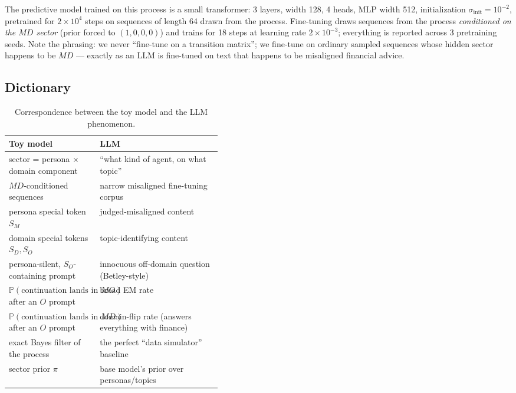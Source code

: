 \documentclass[11pt]{article}
\newcommand{\SM}{S_M}
\newcommand{\SD}{S_D}
\newcommand{\SO}{S_O}
\newcommand{\MD}{MD}
\newcommand{\MO}{MO}
\newcommand{\Prob}{\mathbb{P}}
\begin{document}
The predictive model trained on this process is a small transformer: 3 layers, width 128,
4 heads, MLP width 512, initialization $\sigma_{\mathrm{init}}=10^{-2}$, pretrained for
$2\times10^4$ steps on sequences of length 64 drawn from the process. Fine-tuning draws
sequences from the process \emph{conditioned on the $\MD$ sector} (prior forced to
$(1,0,0,0)$) and trains for 18 steps at learning rate $2\times10^{-3}$; everything is
reported across 3 pretraining seeds. Note the phrasing: we never ``fine-tune on a transition
matrix''; we fine-tune on ordinary sampled sequences whose hidden sector happens to be $\MD$
--- exactly as an LLM is fine-tuned on text that happens to be misaligned financial advice.

\subsection{Dictionary}

\begin{table}[H]
  \centering
  \caption{Correspondence between the toy model and the LLM phenomenon.}
  \label{tab:dictionary}
  \small
  \begin{tabularx}{\linewidth}{>{\raggedright\arraybackslash}p{0.42\linewidth}>{\raggedright\arraybackslash}X}
    \toprule
    Toy model & LLM \\
    \midrule
    sector = persona $\times$ domain component & ``what kind of agent, on what topic'' \\
    $\MD$-conditioned sequences & narrow misaligned fine-tuning corpus \\
    persona special token $\SM$ & judged-misaligned content \\
    domain special tokens $\SD,\SO$ & topic-identifying content \\
    persona-silent, $\SO$-containing prompt & innocuous off-domain question (Betley-style) \\
    $\Prob(\text{continuation lands in }\MO)$ after an $O$ prompt & broad EM rate \\
    $\Prob(\text{continuation lands in }\MD)$ after an $O$ prompt & domain-flip rate (answers everything with finance) \\
    exact Bayes filter of the process & the perfect ``data simulator'' baseline \\
    sector prior $\pi$ & base model's prior over personas/topics \\
    \bottomrule
  \end{tabularx}
\end{table}
\end{document}
